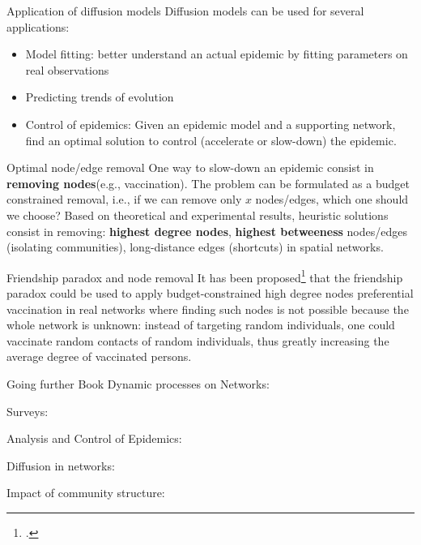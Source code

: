 \documentclass[a4paper,11pt]{book}
\begin{document}
\begin{textbox}{Application of diffusion models}
Diffusion models can be used for several applications: 
\begin{itemize}
    \item Model fitting: better understand an actual epidemic by fitting parameters on real observations
    \item Predicting trends of evolution 
    \item Control of epidemics: Given an epidemic model and a supporting network, find an optimal solution to control (accelerate or slow-down) the epidemic.
\end{itemize}

\end{textbox}


\begin{textbox}{Optimal node/edge removal}
One way to slow-down an epidemic consist in \textbf{removing nodes}(e.g., vaccination). The problem can be formulated as a budget constrained removal, i.e., if we can remove only $x$ nodes/edges, which one should we choose? Based on theoretical and experimental results, heuristic solutions consist in removing: \textbf{highest degree nodes}, \textbf{highest betweeness} nodes/edges (isolating communities), long-distance edges (shortcuts) in spatial networks. 
\end{textbox}

\begin{textbox}{Friendship paradox and node removal}
It has been proposed\footcite{cohen2003efficient} that the friendship paradox could be used to apply budget-constrained high degree nodes preferential vaccination in real networks where finding such nodes is not possible because the whole network is unknown: instead of targeting random individuals, one could vaccinate random contacts of random individuals, thus greatly increasing the average degree of vaccinated persons.
\end{textbox}





\begin{textbox}{Going further}
Book Dynamic processes on Networks: \cite{barrat2008dynamical}

Surveys:

Analysis and Control of Epidemics: \cite{nowzari2016analysis}

Diffusion in networks: \cite{lamberson2016diffusion}

Impact of community structure: \cite{stegehuis2016epidemic}
\end{textbox}


\end{document}
